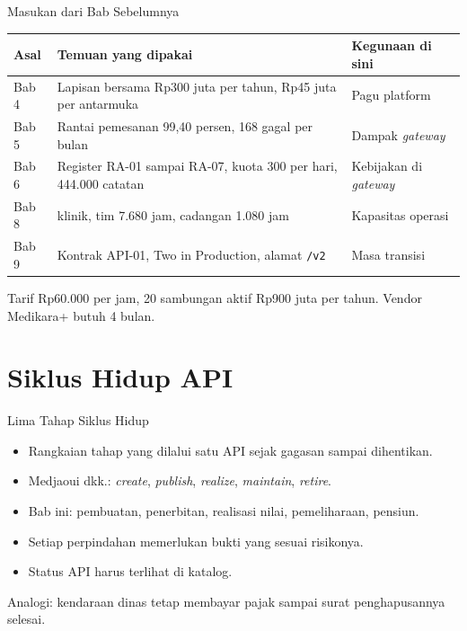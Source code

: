 \documentclass[aspectratio=169, table, 12pt]{beamer}
\begin{document}
\begin{frame}{{\Large Masukan dari Bab Sebelumnya}}
  \footnotesize
  \begin{tabularx}{\textwidth}{>{\raggedright\arraybackslash}p{1.3cm} >{\raggedright\arraybackslash}X >{\raggedright\arraybackslash}p{5.0cm}}
    \hline
    \textbf{Asal} & \textbf{Temuan yang dipakai} & \textbf{Kegunaan di sini} \\ \hline
    Bab 4 & Lapisan bersama Rp300 juta per tahun, Rp45 juta per antarmuka & Pagu platform \\ \hline
    Bab 5 & Rantai pemesanan 99,40 persen, 168 gagal per bulan & Dampak \textit{gateway} \\ \hline
    Bab 6 & Register RA-01 sampai RA-07, kuota 300 per hari, 444.000 catatan & Kebijakan di \textit{gateway} \\ \hline
    Bab 8 & 40 klinik, tim 7.680 jam, cadangan 1.080 jam & Kapasitas operasi \\ \hline
    Bab 9 & Kontrak API-01, Two in Production, alamat \texttt{/v2} & Masa transisi \\ \hline
  \end{tabularx}

  \vspace{8pt}
  \small Tarif Rp60.000 per jam, 20 sambungan aktif Rp900 juta per tahun. Vendor Medikara+ butuh 4 bulan.
\end{frame}

\section{Siklus Hidup API}

\begin{frame}{{\Large Lima Tahap Siklus Hidup}}
  \vspace{8pt}
  \begin{itemize}
    \item Rangkaian tahap yang dilalui satu API sejak gagasan sampai dihentikan.
    \item Medjaoui dkk.: \textit{create}, \textit{publish}, \textit{realize}, \textit{maintain}, \textit{retire}.
    \item Bab ini: pembuatan, penerbitan, realisasi nilai, pemeliharaan, pensiun.
    \item Setiap perpindahan memerlukan bukti yang sesuai risikonya.
    \item Status API harus terlihat di katalog.
  \end{itemize}
  \vspace{6pt}
  {\small Analogi: kendaraan dinas tetap membayar pajak sampai surat penghapusannya selesai.}
\end{frame}
\end{document}

